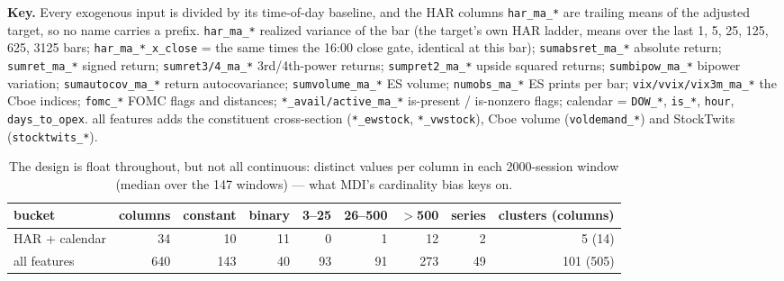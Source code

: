 \documentclass[10pt]{article}
\begin{document}
\textbf{Key.} Every exogenous input is divided by its time-of-day baseline, and the HAR columns \texttt{har\_ma\_*} are trailing means of the adjusted target, so no name carries a prefix. \texttt{har\_ma\_*} realized variance of the bar (the target's own HAR ladder, means over the last 1, 5, 25, 125, 625, 3125 bars; \texttt{har\_ma\_*\_x\_close} = the same times the 16:00 close gate, identical at this bar); \texttt{sumabsret\_ma\_*} absolute return; \texttt{sumret\_ma\_*} signed return; \texttt{sumret3/4\_ma\_*} 3rd/4th-power returns; \texttt{sumpret2\_ma\_*} upside squared returns; \texttt{sumbipow\_ma\_*} bipower variation; \texttt{sumautocov\_ma\_*} return autocovariance; \texttt{sumvolume\_ma\_*} ES volume; \texttt{numobs\_ma\_*} ES prints per bar; \texttt{vix/vvix/vix3m\_ma\_*} the Cboe indices; \texttt{fomc\_*} FOMC flags and distances; \texttt{*\_avail/active\_ma\_*} is-present / is-nonzero flags; calendar = \texttt{DOW\_*}, \texttt{is\_*}, \texttt{hour}, \texttt{days\_to\_opex}. all features adds the constituent cross-section (\texttt{*\_ewstock}, \texttt{*\_vwstock}), Cboe volume (\texttt{voldemand\_*}) and StockTwits (\texttt{stocktwits\_*}).

\begin{table}[H]\centering\footnotesize
\caption{The design is float throughout, but not all continuous: distinct values per column in each 2000-session window (median over the 147 windows) --- what MDI's cardinality bias keys on.}
\begin{tabular}{lrrrrrrrr}\toprule
bucket & columns & constant & binary & 3--25 & 26--500 & $>$500 & series & clusters (columns)\\\midrule
HAR + calendar & 34 & 10 & 11 & 0 & 1 & 12 & 2 & 5 (14) \\
all features & 640 & 143 & 40 & 93 & 91 & 273 & 49 & 101 (505) \\
\bottomrule\end{tabular}\end{table}
\end{document}
